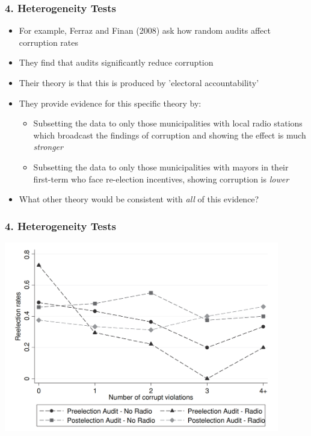 \documentclass[xcolor=x11names,compress]{beamer}\usepackage[]{graphicx}\usepackage[]{xcolor}
\renewcommand{\(}{\begin{columns}}
\renewcommand{\)}{\end{columns}}
\newcommand{\<}[1]{\begin{column}{#1}}
\renewcommand{\>}{\end{column}}
\begin{document}
\begin{frame}
\frametitle{4. Heterogeneity Tests}
\begin{itemize}
\item For example, Ferraz and Finan (2008) ask how random audits affect corruption rates
\pause
\item They find that audits significantly reduce corruption
\pause
\item Their theory is that this is produced by 'electoral accountability'   
\pause
\item They provide evidence for this specific theory by:
\pause
\begin{itemize}
\item Subsetting the data to only those municipalities with local radio stations which broadcast the findings of corruption and showing the effect is much \textit{stronger}
\pause
\item Subsetting the data to only those municipalities with mayors in their first-term who face re-election incentives, showing corruption is \textit{lower}
\pause
\end{itemize}
\item What other theory would be consistent with \textit{all} of this evidence?
\end{itemize}
\end{frame}

\begin{frame}
\frametitle{4. Heterogeneity Tests}
\includegraphics[width=0.9\textwidth]{Ferraz_Finan_heterogeneity.png}
\end{frame}
\end{document}
